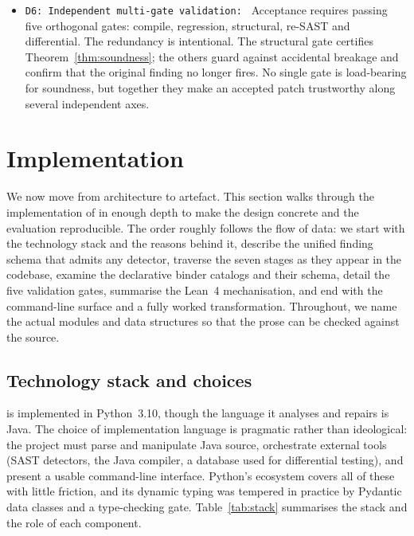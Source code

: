 \begin{itemize}
\item \texttt{D6: Independent multi-gate validation: }
Acceptance requires passing five orthogonal gates: compile, regression,
structural, re-SAST and differential. The redundancy is intentional. The
structural gate certifies Theorem~\ref{thm:soundness}; the others guard
against accidental breakage and confirm that the original finding no longer
fires. No single gate is load-bearing for soundness, but together they make
an accepted patch trustworthy along several independent axes.

\end{itemize}
\section{Implementation}
\label{rem:impl}

We now move from architecture to artefact. This section walks through the
implementation of \irsam{} in enough depth to make the design concrete and
the evaluation reproducible. The order roughly follows the flow of data: we
start with the technology stack and the reasons behind it, describe the
unified finding schema that admits any detector, traverse the seven stages
as they appear in the codebase, examine the declarative binder catalogs and
their schema, detail the five validation gates, summarise the Lean~4
mechanisation, and end with the command-line surface and a fully worked
transformation. Throughout, we name the actual modules and data structures
so that the prose can be checked against the source.

\subsection{Technology stack and choices}
\label{sec:stack}

\irsam{} is implemented in Python~3.10, though the language it analyses and
repairs is Java. The choice of implementation language is pragmatic rather
than ideological: the project must parse and manipulate Java source,
orchestrate external tools (SAST detectors, the Java compiler, a database
used for differential testing), and present a usable command-line interface.
Python's ecosystem covers all of these with little friction, and its dynamic
typing was tempered in practice by Pydantic data classes and a 
type-checking gate. Table~\ref{tab:stack} summarises the stack and the role
of each component.

